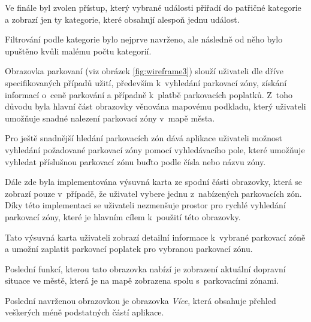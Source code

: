 \begin{minipage}[t]{0.45\textwidth}
  Ve finále byl zvolen přístup, který vybrané události přiřadí do patřičné kategorie a zobrazí jen ty kategorie, které obsahují alespoň jednu událost.

  Filtrování podle kategorie bylo nejprve navrženo, ale následně od něho bylo upuštěno kvůli malému počtu kategorií.
  




Obrazovka parkovaní (viz obrázek \ref{fig:wireframe3}) slouží uživateli dle dříve specifikovaných případů užití, především k~vyhledání parkovací zóny, 
získání informací o~ceně parkování a případně k~platbě parkovacích poplatků. Z~toho důvodu byla hlavní část obrazovky věnována mapovému podkladu, 
který uživateli umožňuje snadné nalezení parkovací zóny v~mapě města. %


Pro ještě snadnější hledání parkovacích zón dává aplikace uživateli možnost vyhledání požadované parkovací zóny pomocí vyhledávacího pole, které umožňuje vyhledat příslušnou parkovací zónu buďto podle čísla nebo názvu zóny. 

Dále zde byla implementována výsuvná karta ze spodní části obrazovky, která se zobrazí pouze v~případě, že uživatel vybere jednu
z~nabízených parkovacích zón. Díky této implementaci se uživateli nezmenšuje prostor pro rychlé vyhledání parkovací zóny,
které je hlavním cílem k~použití této obrazovky. 

Tato výsuvná karta uživateli zobrazí detailní informace k~vybrané parkovací zóně a umožní zaplatit parkovací poplatek pro vybranou parkovací zónu.

Poslední funkcí, kterou tato obrazovka nabízí je zobrazení aktuální dopravní situace ve městě, která je na mapě zobrazena spolu s~parkovacími zónami.

\bigskip
{}
Poslední navrženou obrazovkou je obrazovka \textit{Více}, která obsahuje přehled veškerých méně podstatných částí aplikace.







\end{minipage}
